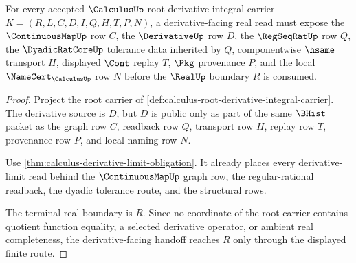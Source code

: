 \begin{theorem}
\label{thm:calculus-root-derivative-real-handoff}
For every accepted $\CalculusUp$ root derivative-integral carrier $K=(R,L,C,D,I,Q,H,T,P,N)$, a derivative-facing real read must expose the $\ContinuousMapUp$ row $C$, the $\DerivativeUp$ row $D$, the $\RegSeqRatUp$ row $Q$, the $\DyadicRatCoreUp$ tolerance data inherited by $Q$, componentwise $\hsame$ transport $H$, displayed $\Cont$ replay $T$, $\Pkg$ provenance $P$, and the local $\NameCert_{\CalculusUp}$ row $N$ before the $\RealUp$ boundary $R$ is consumed.
\end{theorem}
\begin{proof}
Project the root carrier of \autoref{def:calculus-root-derivative-integral-carrier}. The derivative source is $D$, but $D$ is public only as part of the same $\BHist$ packet as the graph row $C$, readback row $Q$, transport row $H$, replay row $T$, provenance row $P$, and local naming row $N$.

Use \autoref{thm:calculus-derivative-limit-obligation}. It already places every derivative-limit read behind the $\ContinuousMapUp$ graph row, the regular-rational readback, the dyadic tolerance route, and the structural rows.

The terminal real boundary is $R$. Since no coordinate of the root carrier contains quotient function equality, a selected derivative operator, or ambient real completeness, the derivative-facing handoff reaches $R$ only through the displayed finite route.
\end{proof}


